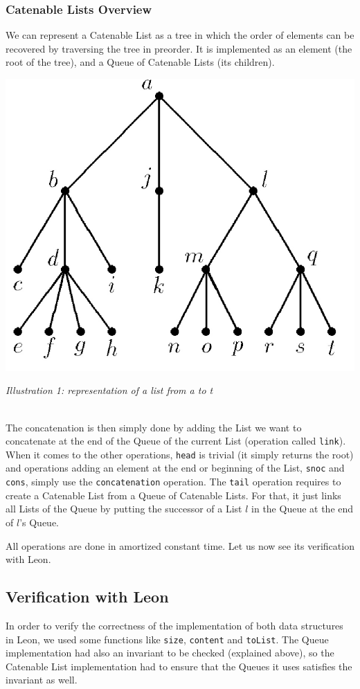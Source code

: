\subsubsection{Catenable Lists Overview}
We can represent a Catenable List as a tree 
in which the order of elements can be recovered by traversing the tree in preorder.
It is implemented as an element (the root of the tree), 
and a Queue of Catenable Lists (its children).
\\
\centerline{\includegraphics[scale=0.17]{preorder}}
\centerline{\emph{Illustration 1: representation of a list from a to t}}
\centerline{}
\\
The concatenation is then simply done by adding the List we want to concatenate 
at the end of the Queue of the current List 
(operation called \verb|link|).
When it comes to the other operations,
\verb|head| is trivial (it simply returns the root)
and operations adding an element at the end or beginning of the List, 
\verb|snoc| and \verb|cons|,
simply use the \verb|concatenation| operation.
The \verb|tail| operation requires 
to create a Catenable List from a Queue of Catenable Lists.
For that, it just links all Lists of the Queue 
by putting the successor of a List $l$ in the Queue at the end of $l$'s Queue.

All operations are done in amortized constant time.
Let us now see its verification with Leon.

\subsection{Verification with Leon}
In order to verify the correctness of the implementation of both data structures in Leon,
we used some functions like \verb|size|, \verb|content| and \verb|toList|.
The Queue implementation had also an invariant to be checked (explained above),
so the Catenable List implementation had to ensure that the Queues it uses 
satisfies the invariant as well.

